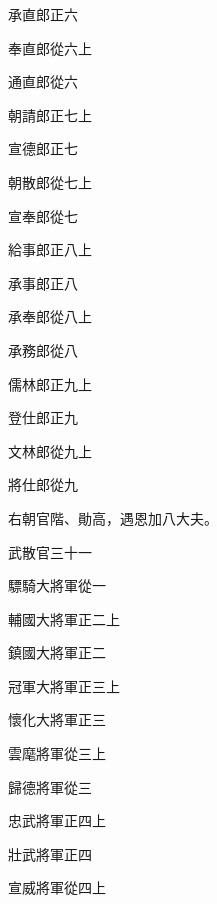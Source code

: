 \begin{pinyinscope}
 承直郎正六



 奉直郎從六上



 通直郎從六



 朝請郎正七上



 宣德郎正七



 朝散郎從七上



 宣奉郎從七



 給事郎正八上



 承事郎正八



 承奉郎從八上



 承務郎從八



 儒林郎正九上



 登仕郎正九



 文林郎從九上



 將仕郎從九



 右朝官階、勛高，遇恩加八大夫。



 武散官三十一



 驃騎大將軍從一



 輔國大將軍正二上



 鎮國大將軍正二



 冠軍大將軍正三上



 懷化大將軍正三



 雲麾將軍從三上



 歸德將軍從三



 忠武將軍正四上



 壯武將軍正四



 宣威將軍從四上




\end{pinyinscope}
